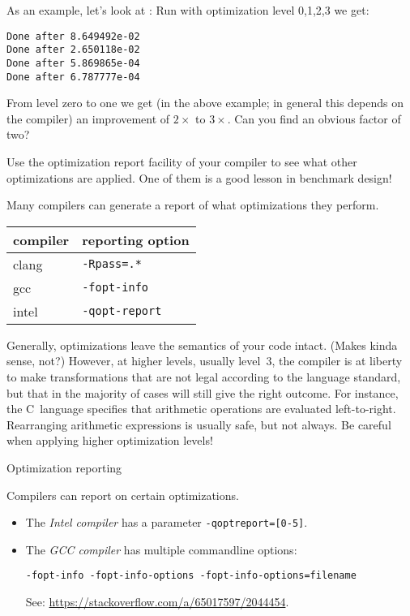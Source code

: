 As an example, let's look at :
Run with optimization level 0,1,2,3 we get:
\begin{verbatim}
Done after 8.649492e-02
Done after 2.650118e-02
Done after 5.869865e-04
Done after 6.787777e-04
\end{verbatim}
\begin{exercise}
  \label{ex:givens-optimize}
  From level zero to one we get (in the above example;
  in general this depends on the compiler) an improvement
  of $2\times$ to $3\times$. Can you find an obvious factor of two?

  Use the optimization report facility of your compiler to see what
  other optimizations are applied. One of them is a good lesson in
  benchmark design!
\end{exercise}

Many compilers can generate a report of what optimizations they perform.

\begin{tabular}{ll}
  \toprule
  compiler&reporting option\\
  \midrule
  clang& \texttt{-Rpass=.*}\\
  gcc&   \texttt{-fopt-info}\\
  intel& \texttt{-qopt-report}\\
  \bottomrule
\end{tabular}

Generally, optimizations leave the semantics of your code
intact. (Makes kinda sense, not?)  However, at higher levels,
usually level~3, the compiler is
at liberty to make transformations that are not legal
according to the language standard, but that in the majority of cases
will still give the right outcome. For instance, the C~language
specifies that arithmetic operations are evaluated left-to-right.
Rearranging arithmetic expressions is usually safe, but not always.
Be careful when applying higher optimization levels!

 {Optimization reporting}

Compilers can report on certain optimizations.
\begin{itemize}
\item The \emph{Intel compiler}
  has a parameter \lstinline{-qoptreport=[0-5]}.
\item The \emph{GCC compiler}
  has multiple commandline options:
\begin{lstlisting}
-fopt-info -fopt-info-options -fopt-info-options=filename
\end{lstlisting}
See: \url{https://stackoverflow.com/a/65017597/2044454}.
\end{itemize}

